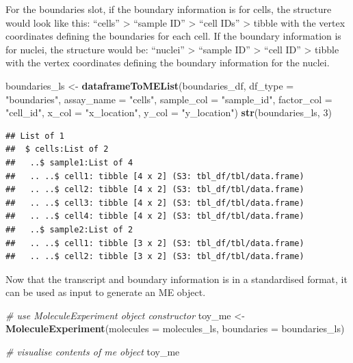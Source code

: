 \documentclass[
]{article}
\newenvironment{Shaded}{\begin{snugshade}}{\end{snugshade}}
\newcommand{\CommentTok}[1]{\textcolor[rgb]{0.56,0.35,0.01}{\textit{#1}}}
\newcommand{\DataTypeTok}[1]{\textcolor[rgb]{0.13,0.29,0.53}{#1}}
\newcommand{\DecValTok}[1]{\textcolor[rgb]{0.00,0.00,0.81}{#1}}
\newcommand{\KeywordTok}[1]{\textcolor[rgb]{0.13,0.29,0.53}{\textbf{#1}}}
\newcommand{\NormalTok}[1]{#1}
\newcommand{\StringTok}[1]{\textcolor[rgb]{0.31,0.60,0.02}{#1}}
\begin{document}
For the boundaries slot, if the boundary information is for cells, the
structure would look like this: ``cells'' \textgreater{} ``sample ID''
\textgreater{} ``cell IDs'' \textgreater{} tibble with the vertex
coordinates defining the boundaries for each cell. If the boundary
information is for nuclei, the structure would be: ``nuclei''
\textgreater{} ``sample ID'' \textgreater{} ``cell ID'' \textgreater{}
tibble with the vertex coordinates defining the boundary information for
the nuclei.

\begin{Shaded}
\begin{Highlighting}[]
\NormalTok{boundaries\_ls \textless{}{-}}\StringTok{ }\KeywordTok{dataframeToMEList}\NormalTok{(boundaries\_df,}
                                   \DataTypeTok{df\_type =} \StringTok{"boundaries"}\NormalTok{,}
                                   \DataTypeTok{assay\_name =} \StringTok{"cells"}\NormalTok{,}
                                   \DataTypeTok{sample\_col =} \StringTok{"sample\_id"}\NormalTok{,}
                                   \DataTypeTok{factor\_col =} \StringTok{"cell\_id"}\NormalTok{,}
                                   \DataTypeTok{x\_col =} \StringTok{"x\_location"}\NormalTok{,}
                                   \DataTypeTok{y\_col =} \StringTok{"y\_location"}\NormalTok{)}
\KeywordTok{str}\NormalTok{(boundaries\_ls, }\DecValTok{3}\NormalTok{)}
\end{Highlighting}
\end{Shaded}

\begin{verbatim}
## List of 1
##  $ cells:List of 2
##   ..$ sample1:List of 4
##   .. ..$ cell1: tibble [4 x 2] (S3: tbl_df/tbl/data.frame)
##   .. ..$ cell2: tibble [4 x 2] (S3: tbl_df/tbl/data.frame)
##   .. ..$ cell3: tibble [4 x 2] (S3: tbl_df/tbl/data.frame)
##   .. ..$ cell4: tibble [4 x 2] (S3: tbl_df/tbl/data.frame)
##   ..$ sample2:List of 2
##   .. ..$ cell1: tibble [3 x 2] (S3: tbl_df/tbl/data.frame)
##   .. ..$ cell2: tibble [3 x 2] (S3: tbl_df/tbl/data.frame)
\end{verbatim}

Now that the transcript and boundary information is in a standardised
format, it can be used as input to generate an ME object.

\begin{Shaded}
\begin{Highlighting}[]
\CommentTok{\# use MoleculeExperiment object constructor}
\NormalTok{toy\_me \textless{}{-}}\StringTok{ }\KeywordTok{MoleculeExperiment}\NormalTok{(}\DataTypeTok{molecules =}\NormalTok{ molecules\_ls,}
                          \DataTypeTok{boundaries =}\NormalTok{ boundaries\_ls)}

\CommentTok{\# visualise contents of me object}
\NormalTok{toy\_me}
\end{Highlighting}
\end{Shaded}
\end{document}
